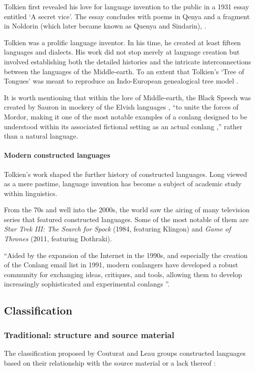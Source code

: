\documentclass[14pt, a4paper]{extreport}
\begin{document}
Tolkien first revealed his love for language invention to the public in a 1931 essay entitled `A secret vice'. The essay concludes with poems in Qenya and a fragment in Noldorin (which later became known as Quenya and Sindarin), \parencite{tolkien83}.

Tolkien was a prolific language inventor. In his time, he created at least fifteen languages and dialects. His work did not stop merely at language creation but involved establishing both the detailed histories and the intricate interconnections between the languages of the Middle-earth. To an extent that Tolkien's `Tree of Tongues' was meant to reproduce an Indo-European genealogical tree model \parencite[101]{fimi}.

It is worth mentioning that within the lore of Middle-earth, the Black Speech was created by Sauron in mockery of the Elvish languages \parencite[20]{tolkien19}, ``to unite the forces of Mordor, making it one of the most notable examples of a conlang designed to be understood within its associated fictional setting as an actual conlang \parencite{sanders},'' rather than a natural language.
        \paragraph{Modern constructed languages}
Tolkien's work shaped the further history of constructed languages. Long viewed as a mere pastime, language invention has become a subject of academic study within linguistics.

From the 70s and well into the 2000s, the world saw the airing of many television series that featured constructed languages. Some of the most notable of them are \textit{Star Trek III: The Search for Spock} (1984, featuring Klingon) and \textit{Game of Thrones} (2011, featuring Dothraki).

``Aided by the expansion of the Internet in the 1990s, and especially the creation of the Conlang email list in 1991, modern conlangers have developed a robust community for exchanging ideas, critiques, and tools, allowing them to develop increasingly sophisticated and experimental conlangs \parencite{sanders}''.
    \subsection{Classification}
      \subsubsection{Traditional: structure and source material}
The classification proposed by Couturat and Leau groups constructed languages based on their relationship with the source material or a lack thereof \parencite{couturat}:
\end{document}
